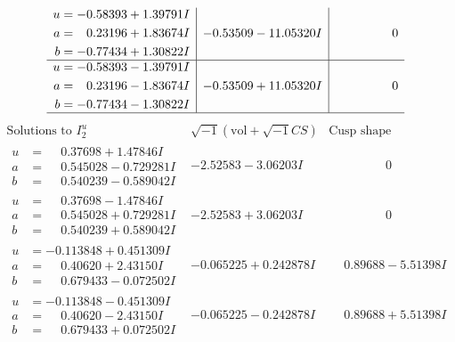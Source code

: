 \documentclass[1p]{elsarticle_modified}
\theoremstyle{definition}
\newcommand{\I}{\sqrt{-1}}
\begin{document}
$$\begin{array}{c|c|c}
\begin{aligned}
u &= -0.58393 + 1.39791 I \\
a &= \phantom{-}0.23196 + 1.83674 I \\
b &= -0.77434 + 1.30822 I\end{aligned}
 & -0.53509 - 11.05320 I & \phantom{-0.000000 } 0 \\ \hline\begin{aligned}
u &= -0.58393 - 1.39791 I \\
a &= \phantom{-}0.23196 - 1.83674 I \\
b &= -0.77434 - 1.30822 I\end{aligned}
 & -0.53509 + 11.05320 I & \phantom{-0.000000 } 0\\
 \hline 
 \end{array}$$\newpage$$\begin{array}{c|c|c}  
\text{Solutions to }I^u_{2}& \I (\text{vol} + \sqrt{-1}CS) & \text{Cusp shape}\\
 \hline 
\begin{aligned}
u &= \phantom{-}0.37698 + 1.47846 I \\
a &= \phantom{-}0.545028 - 0.729281 I \\
b &= \phantom{-}0.540239 - 0.589042 I\end{aligned}
 & -2.52583 - 3.06203 I & \phantom{-0.000000 } 0 \\ \hline\begin{aligned}
u &= \phantom{-}0.37698 - 1.47846 I \\
a &= \phantom{-}0.545028 + 0.729281 I \\
b &= \phantom{-}0.540239 + 0.589042 I\end{aligned}
 & -2.52583 + 3.06203 I & \phantom{-0.000000 } 0 \\ \hline\begin{aligned}
u &= -0.113848 + 0.451309 I \\
a &= \phantom{-}0.40620 + 2.43150 I \\
b &= \phantom{-}0.679433 - 0.072502 I\end{aligned}
 & -0.065225 + 0.242878 I & \phantom{-}0.89688 - 5.51398 I \\ \hline\begin{aligned}
u &= -0.113848 - 0.451309 I \\
a &= \phantom{-}0.40620 - 2.43150 I \\
b &= \phantom{-}0.679433 + 0.072502 I\end{aligned}
 & -0.065225 - 0.242878 I & \phantom{-}0.89688 + 5.51398 I \\ \hline\begin{aligned}

\end{aligned}
\end{array}$$
\end{document}
